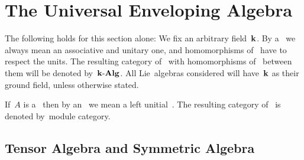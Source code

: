 \chapter{The Universal Enveloping Algebra}


\begin{convention}
  The following holds for this section alone:
  We fix an arbitrary field~$\kf$.
  By a~{\algebra{$\kf$}} we always mean an associative and unitary one, and homomorphisms of~{\algebras{$\kf$}} have to respect the units.
  The resulting category of~{\algebras{$\kf$}} with homomorphisms of~{\algebra{$\kf$}} between them will be denoted by~$\mathbf{k}\text{-}\mathbf{Alg}$.
  All Lie~algebras considered will have~$\kf$ as their ground field, unless otherwise stated.
  
  If~$A$ is a~{\algebra{$\kf$}} then by an~ we mean a left unitial~{}.
  The resulting category of~{} is denoted by~\gls*{module category}.
\end{convention}





\section{Tensor Algebra and Symmetric Algebra}


